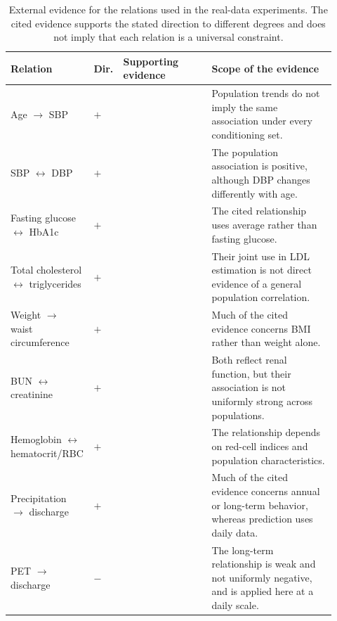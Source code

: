 \begin{table}[h]
\caption{External evidence for the relations used in the real-data experiments. The cited evidence supports the stated direction to different degrees and does not imply that each relation is a universal constraint.}
\label{tab:app-relation-evidence}
\centering
\footnotesize
\setlength{\tabcolsep}{3pt}

\begin{tabular}{P{0.20\linewidth}P{0.07\linewidth}P{0.27\linewidth}P{0.38\linewidth}}
\toprule
Relation & Dir. & Supporting evidence & Scope of the evidence \\
\midrule

Age $\rightarrow$ SBP
& $+$
& \citep{franklin1997hemodynamic,mitchell2010hemodynamic}
& Population trends do not imply the same association under every conditioning set. \\
\midrule

SBP $\leftrightarrow$ DBP
& $+$
& \citep{zhu2022pleiotropy,franklin1997hemodynamic}
& The population association is positive, although DBP changes differently with age. \\
\midrule

Fasting glucose $\leftrightarrow$ HbA1c
& $+$
& \citep{nathan2008translating}
& The cited relationship uses average rather than fasting glucose. \\
\midrule

Total cholesterol $\leftrightarrow$ triglycerides
& $+$
& \citep{friedewald1972estimation,wolska2026newmethods}
& Their joint use in LDL estimation is not direct evidence of a general population correlation. \\
\midrule

Weight $\rightarrow$ waist circumference
& $+$
& \citep{flegal2009comparisons,ross2020waist}
& Much of the cited evidence concerns BMI rather than weight alone. \\
\midrule

BUN $\leftrightarrow$ creatinine
& $+$
& \citep{hosten1990bun,morgan1977creatinine}
& Both reflect renal function, but their association is not uniformly strong across populations. \\
\midrule

Hemoglobin $\leftrightarrow$ hematocrit/RBC
& $+$
& \citep{doig2017methodical,guevara2023hemoglobin}
& The relationship depends on red-cell indices and population characteristics. \\
\midrule

Precipitation $\rightarrow$ discharge
& $+$
& \citep{zhang2001response,addor2017camels,coxon2020camelsgb,andreassian2025timeshift}
& Much of the cited evidence concerns annual or long-term behavior, whereas prediction uses daily data. \\
\midrule

PET $\rightarrow$ discharge
& $-$
& \citep{zhang2001response,addor2017camels,coxon2020camelsgb,andreassian2025timeshift}
& The long-term relationship is weak and not uniformly negative, and is applied here at a daily scale. \\

\bottomrule
\end{tabular}
\end{table}
